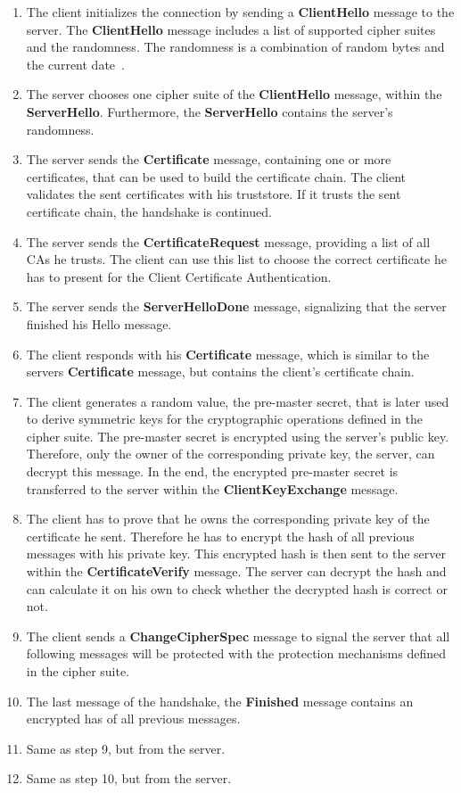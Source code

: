 \begin{enumerate}
	\item The client initializes the connection by sending a \textbf{ClientHello} message to the server.
		The \textbf{ClientHello} message includes a list of supported cipher suites and the randomness.
		The randomness is a combination of random bytes and the current date~\cite{mediumtls}.
	\item The server chooses one cipher suite of the \textbf{ClientHello} message, within the \textbf{ServerHello}.
		Furthermore, the \textbf{ServerHello} contains the server's randomness.
	\item The server sends the \textbf{Certificate} message, containing one or more certificates, that can be used to build the certificate chain.
		The client validates the sent certificates with his truststore.
		If it trusts the sent certificate chain, the handshake is continued.
	\item The server sends the \textbf{CertificateRequest} message, providing a list of all CAs he trusts.
		The client can use this list to choose the correct certificate he has to present for the Client Certificate Authentication.
	\item The server sends the \textbf{ServerHelloDone} message, signalizing that the server finished his Hello message.
	\item The client responds with his \textbf{Certificate} message, which is similar to the servers \textbf{Certificate} message, but contains the client's certificate chain.
	\item The client generates a random value, the pre-master secret, that is later used to derive symmetric keys for the cryptographic operations defined in the cipher suite.
		The pre-master secret is encrypted using the server's public key.
		Therefore, only the owner of the corresponding private key, the server, can decrypt this message.
		In the end, the encrypted pre-master secret is transferred to the server within the \textbf{ClientKeyExchange} message.
	\item The client has to prove that he owns the corresponding private key of the certificate he sent.
		Therefore he has to encrypt the hash of all previous messages with his private key.
		This encrypted hash is then sent to the server within the \textbf{CertificateVerify} message.
		The server can decrypt the hash and can calculate it on his own to check whether the decrypted hash is correct or not.
	\item The client sends a \textbf{ChangeCipherSpec} message to signal the server that all following messages will be protected with the protection mechanisms defined in the cipher suite.
	\item The last message of the handshake, the \textbf{Finished} message contains an encrypted has of all previous messages.
	\item Same as step 9, but from the server.
	\item Same as step 10, but from the server.
\end{enumerate}

